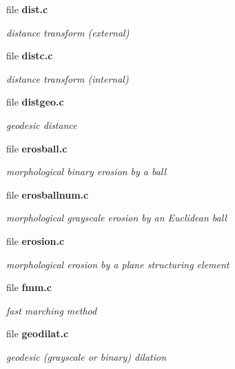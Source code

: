 \begin{CompactItemize}
\item 
file \bf{dist.c}
\begin{CompactList}\small\item\em distance transform (external) \item\end{CompactList}

\item 
file \bf{distc.c}
\begin{CompactList}\small\item\em distance transform (internal) \item\end{CompactList}

\item 
file \bf{distgeo.c}
\begin{CompactList}\small\item\em geodesic distance \item\end{CompactList}

\item 
file \bf{erosball.c}
\begin{CompactList}\small\item\em morphological binary erosion by a ball \item\end{CompactList}

\item 
file \bf{erosballnum.c}
\begin{CompactList}\small\item\em morphological grayscale erosion by an Euclidean ball \item\end{CompactList}

\item 
file \bf{erosion.c}
\begin{CompactList}\small\item\em morphological erosion by a plane structuring element \item\end{CompactList}

\item 
file \bf{fmm.c}
\begin{CompactList}\small\item\em fast marching method \item\end{CompactList}

\item 
file \bf{geodilat.c}
\begin{CompactList}\small\item\em geodesic (grayscale or binary) dilation \item\end{CompactList}


\end{CompactItemize}
